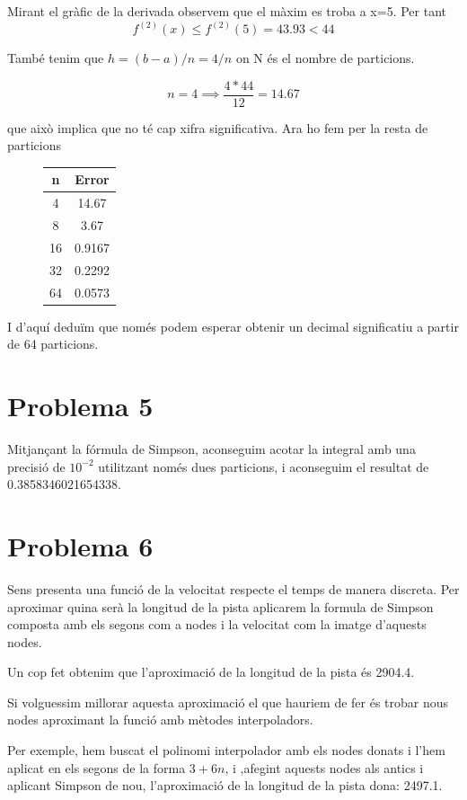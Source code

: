 \documentclass{article}
\begin{document}
	Mirant el gràfic de la derivada observem que el màxim es troba a x=5. Per tant
	$$f^{(2)}(x)\leq f^{(2)}(5)=43.93<44$$
	
	També tenim que $h=(b-a)/n=4/n$ on N és el nombre de particions.
	
	$$n=4\implies\frac{4*44}{12}=14.67$$
	
	que això implica que no té cap xifra significativa. Ara ho fem per la resta de particions
	
	\vspace{6cm}
	
	\begin{figure}[h!]
		\begin{center}
			\begin{tabular}{|c|c|}
				\hline
				n & Error \\ \hline
				4 & 14.67 \\ \hline
				8 & 3.67 \\ \hline
				16 & 0.9167 \\ \hline
				32 & 0.2292 \\ \hline
				64 & 0.0573 \\ \hline
			\end{tabular}
		\end{center}
	\end{figure}
	
	I d'aquí deduïm que només podem esperar obtenir un decimal significatiu a partir de 64 particions.
	
	\newpage
		
	\section{Problema 5}
	
	Mitjançant la fórmula de Simpson, aconseguim acotar la integral amb una precisió de $10^{-2}$ utilitzant només dues particions, i aconseguim el resultat de 0.3858346021654338.
	
	\newpage
	
	\section{Problema 6}
	
	Sens presenta una funció de la velocitat respecte el temps de manera discreta. Per aproximar quina serà la longitud de la pista aplicarem la formula de Simpson composta amb els segons com a nodes i la velocitat com la imatge d'aquests nodes.
	
	Un cop fet obtenim que l'aproximació de la longitud de la pista és 2904.4.
	
	Si volguessim millorar aquesta aproximació el que hauriem de fer és trobar nous nodes aproximant la funció amb mètodes interpoladors.
	
	Per exemple, hem buscat el polinomi interpolador amb els nodes donats i l'hem aplicat en els segons de la forma $3+6n$, i ,afegint aquests nodes als antics i aplicant Simpson de nou, l'aproximació de la longitud de la pista dona: 2497.1.
		
\end{document}
